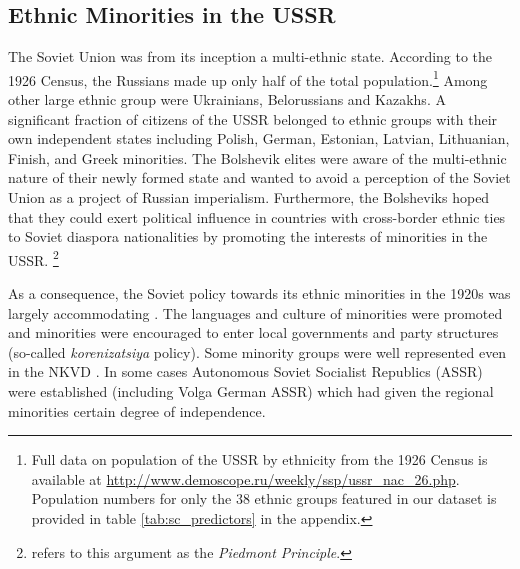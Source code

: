 \subsection{Ethnic Minorities in the USSR}
The Soviet Union was from its inception a multi-ethnic state. 
According to the 1926 Census, the Russians made up only half of the total population.\footnote{Full data on population of the USSR by ethnicity from the 1926 Census is available at   \url{http://www.demoscope.ru/weekly/ssp/ussr_nac_26.php}. Population numbers for only the 38 ethnic groups featured in our dataset is provided in table \ref{tab:sc_predictors} in the appendix.} Among other large ethnic group were Ukrainians, Belorussians and Kazakhs.  A significant fraction of citizens of the USSR belonged to ethnic groups with their own independent states including Polish, German, Estonian, Latvian, Lithuanian, Finish,  and Greek minorities. 
The Bolshevik elites were aware of the multi-ethnic nature of their newly formed state and wanted to  avoid a perception of the Soviet Union as a project of Russian imperialism. Furthermore, the Bolsheviks hoped that
they could exert political influence in countries with cross-border ethnic  ties to Soviet diaspora nationalities 
by promoting the interests of minorities in the USSR. \footnote{ \citet{martin_affirmative_2001} refers to this argument as the \emph{Piedmont Principle}.}

As a consequence, the Soviet policy towards its ethnic minorities in the 1920s was largely accommodating \citep{martin_affirmative_2001}. The languages and culture of minorities were promoted and minorities were encouraged to enter local governments and party structures (so-called \emph{korenizatsiya} policy). Some minority groups were well represented even in the NKVD \citep[p. 25]{gregory_terror_2009}.
In some cases Autonomous Soviet Socialist Republics (ASSR) were established (including Volga German ASSR) which had given the regional minorities certain degree of independence. 

